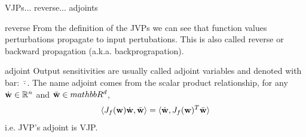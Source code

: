 \documentclass[12pt,xcolor={table}]{beamer}
\newcommand{\wbf}{{\bf w}}
\newcommand{\xbf}{{\bf x}}
\begin{document}
\begin{frame}{VJPs... reverse... adjoints}
  \begin{block}{reverse}
    From the definition of the JVPs we can see that \alert{function values perturbations} propagate to input pertubations. 
    This is also called \alert{reverse} or \alert{backward} propagation (a.k.a. backprograpation).
  \end{block}
  \begin{block}{adjoint}
    Output sensitivities are usually called \alert{adjoint variables} and denoted with bar: $\bar{\cdot}$. 
    The name adjoint comes from the scalar product relationship, for any $\dot{\wbf} \in \mathbb{R}^{n}$ and $\bar{\wbf} \in mathbb{R}^d$,
    $$
    \langle J_f(\wbf) \dot{\wbf}, \bar{\wbf} \rangle = \langle \dot{\wbf}, J_f(\wbf)^T\bar{\wbf} \rangle
    $$
    i.e. JVP's adjoint is VJP.
  \end{block}
\end{frame}




\end{document}
